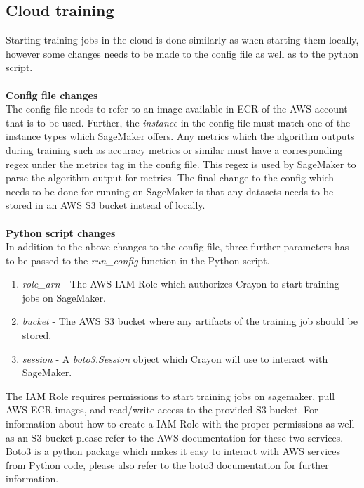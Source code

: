 \subsection{Cloud training}
Starting training jobs in the cloud is done similarly as when starting them locally, however some changes needs to be made to the config file as well as to the python script.
\\
\\
\textbf{Config file changes}
\\
The config file needs to refer to an image available in ECR of the AWS account that is to be used. Further, the \textit{instance} in the config file must match one of the instance types which SageMaker offers. Any metrics which the algorithm outputs during training such as accuracy metrics or similar must have a corresponding regex under the metrics tag in the config file. This regex is used by SageMaker to parse the algorithm output for metrics. The final change to the config which needs to be done for running on SageMaker is that any datasets needs to be stored in an AWS S3 bucket instead of locally.
\\
\\
\textbf{Python script changes}
\label{sagemaker_requirements}
\\
In addition to the above changes to the config file,  three further parameters has to be passed to the \textit{run\_config} function in the Python script.

\begin{enumerate}
    \item \textit{role\_arn} - The AWS IAM Role  which authorizes Crayon to start training jobs on SageMaker.
    \item \textit{bucket} - The AWS S3 bucket where any artifacts of the training job should be stored.
    \item \textit{session} - A \textit{boto3.Session} object which Crayon will use to interact with SageMaker.
\end{enumerate}

The IAM Role requires permissions to start training jobs on sagemaker, pull AWS ECR images, and read/write access to the provided S3 bucket. For information about how to create a IAM Role with the proper permissions as well as an S3 bucket please refer to the AWS documentation for these two services. Boto3 is a python package which makes it easy to interact with AWS services from Python code, please also refer to the boto3 documentation for further information.


